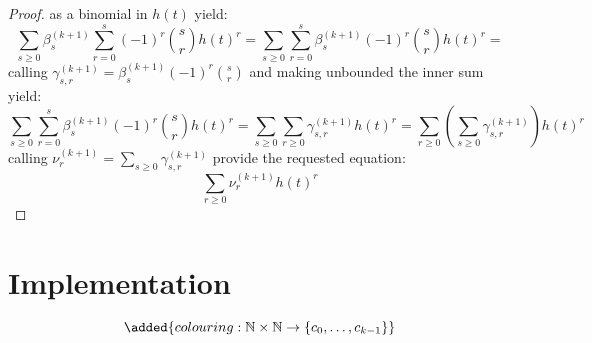 \documentclass[11pt,a4paper]{article} %
\begin{document}
\begin{proof}
    as a binomial in $h(t)$ yield:
    \begin{displaymath}
        \sum_{s\geq 0}{\beta_{s}^{(k+1)} {\sum_{r=0}^{s}{(-1)^{r}{{s}\choose{r}} h(t)^{r}}}} =
        \sum_{s\geq 0}{ \sum_{r=0}^{s}{\beta_{s}^{(k+1)}(-1)^{r}{{s}\choose{r}} h(t)^{r}}} =
    \end{displaymath}
    calling $\gamma_{s,r}^{(k+1)}=\beta_{s}^{(k+1)}(-1)^{r}{{s}\choose{r}}$ and making 
    unbounded the inner sum yield: 
    \begin{displaymath}
        \sum_{s\geq 0}{ \sum_{r=0}^{s}{\beta_{s}^{(k+1)}(-1)^{r}{{s}\choose{r}} h(t)^{r}}} =
        \sum_{s\geq 0}{ \sum_{r\geq 0}{\gamma_{s,r}^{(k+1)} h(t)^{r}}} =
        \sum_{r\geq 0}{ \left(\sum_{s\geq 0}{\gamma_{s,r}^{(k+1)} }\right) h(t)^{r}}
    \end{displaymath}
    calling $\nu_{r}^{(k+1)}=\sum_{s\geq 0}{\gamma_{s,r}^{(k+1)} }$ provide the requested equation:
    \begin{displaymath}
        \sum_{r\geq 0}{ \nu_{r}^{(k+1)} h(t)^{r}}
    \end{displaymath}
    
    

    \end{proof}


    \section{Implementation}

    \begin{displaymath}
    \added{
        colouring : \mathbb{N} \times\mathbb{N} \rightarrow \lbrace c_0, \ldots, c_{k-1} \rbrace
    }
    \end{displaymath}
\end{document}
